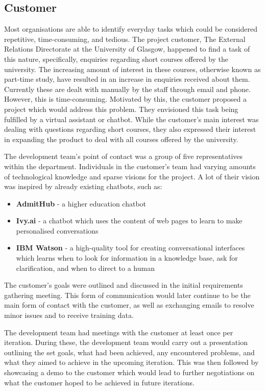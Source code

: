 \documentclass{l3proj}
\begin{document}
\subsection{Customer}
\label{subsec:customer}
Most organisations are able to identify everyday tasks which could be considered repetitive, time-consuming, and tedious. The project customer, The External Relations Directorate at the University of Glasgow, happened to find a task of this nature, specifically, enquiries regarding short courses offered by the university. The increasing amount of interest in these courses, otherwise known as part-time study, have resulted in an increase in enquiries received about them. Currently these are dealt with manually by the staff through email and phone. However, this is time-consuming. Motivated by this, the customer proposed a project which would address this problem. They envisioned this task being fulfilled by a virtual assistant or chatbot. While the customer's main interest was dealing with questions regarding short courses, they also expressed their interest in expanding the product to deal with all courses offered by the university.

The development team's point of contact was a group of five representatives within the department. Individuals in the customer's team had varying amounts of technological knowledge and sparse visions for the project. A lot of their vision was inspired by already existing chatbots, such as:
\begin{itemize}
    \item \textbf{AdmitHub} - a higher education chatbot \cite{ADMITHUB}
    \item \textbf{Ivy.ai} - a chatbot which uses the content of web pages to learn to make personalised conversations \cite{IVYAI}
    \item \textbf{IBM Watson} - a high-quality tool for creating conversational interfaces which learns when to look for information in a knowledge base, ask for clarification, and when to direct to a human \cite{WATSON}
\end{itemize}

The customer's goals were outlined and discussed in the initial requirements gathering meeting. This form of communication would later continue to be the main form of contact with the customer, as well as exchanging emails to resolve minor issues and to receive training data.

The development team had meetings with the customer at least once per iteration. During these, the development team would carry out a presentation outlining the set goals, what had been achieved, any encountered problems, and what they aimed to achieve in the upcoming iteration. This was then followed by showcasing a demo to the customer which would lead to further negotiations on what the customer hoped to be achieved in future iterations.
\end{document}

